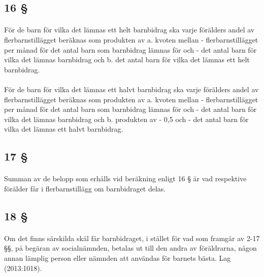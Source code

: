 \documentclass[a4paper,notitlepage,openany,10pt]{book}
\begin{document}
\subsection*{16 §}
\paragraph*{}
För de barn för vilka det lämnas ett helt barnbidrag ska varje förälders andel av flerbarnstillägget beräknas som produkten av
\newline a. kvoten mellan
\newline - flerbarnstillägget per månad för det antal barn som barnbidrag lämnas för och
\newline - det antal barn för vilka det lämnas barnbidrag och
\newline b. det antal barn för vilka det lämnas ett helt barnbidrag.
\paragraph*{}
För de barn för vilka det lämnas ett halvt barnbidrag ska varje förälders andel av flerbarnstillägget beräknas som produkten av
\newline a. kvoten mellan
\newline - flerbarnstillägget per månad för det antal barn som barnbidrag lämnas för och
\newline - det antal barn för vilka det lämnas barnbidrag och
\newline b. produkten av
\newline - 0,5 och
\newline - det antal barn för vilka det lämnas ett halvt barnbidrag.
\subsection*{17 §}
\paragraph*{}
Summan av de belopp som erhålls vid beräkning enligt 16 § är vad respektive förälder får i flerbarnstillägg om barnbidraget delas.
\subsection*{18 §}
\paragraph*{}
Om det finns särskilda skäl får barnbidraget, i stället för vad som framgår av 2-17 §§, på begäran av socialnämnden, betalas ut till den andra av föräldrarna, någon annan lämplig person eller nämnden att användas för barnets bästa.
Lag (2013:1018).
\end{document}

